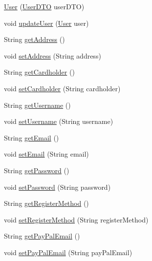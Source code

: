 \begin{DoxyCompactItemize}
\item 
\mbox{\hyperlink{class_s_p_q_1_1data_1_1_user_af8e381901a649027950a0b0f8b22a235}{User}} (\mbox{\hyperlink{class_s_p_q_1_1dto_1_1_user_d_t_o}{User\+D\+TO}} user\+D\+TO)
\item 
void \mbox{\hyperlink{class_s_p_q_1_1data_1_1_user_ac472400b9deed770cf6f3591dc9e2886}{update\+User}} (\mbox{\hyperlink{class_s_p_q_1_1data_1_1_user}{User}} user)
\item 
String \mbox{\hyperlink{class_s_p_q_1_1data_1_1_user_a47d0065ad917d39d23acd62835575179}{get\+Address}} ()
\item 
void \mbox{\hyperlink{class_s_p_q_1_1data_1_1_user_ab6e40ae379cda1d98a5873365df30736}{set\+Address}} (String address)
\item 
String \mbox{\hyperlink{class_s_p_q_1_1data_1_1_user_a6184a8aa1ccfc02796356f648ebf37ee}{get\+Cardholder}} ()
\item 
void \mbox{\hyperlink{class_s_p_q_1_1data_1_1_user_a0fe49415c82bbbbfa0b22822f054157f}{set\+Cardholder}} (String cardholder)
\item 
String \mbox{\hyperlink{class_s_p_q_1_1data_1_1_user_a55d2e322edbbe446287ce25baecdd421}{get\+Username}} ()
\item 
void \mbox{\hyperlink{class_s_p_q_1_1data_1_1_user_ab173655f6fbe57a59cd0da8d0cfbed06}{set\+Username}} (String username)
\item 
String \mbox{\hyperlink{class_s_p_q_1_1data_1_1_user_a4f3ae0062ee7529314a5b791707ff4b4}{get\+Email}} ()
\item 
void \mbox{\hyperlink{class_s_p_q_1_1data_1_1_user_ab7132f971882fb88afc6999cf5473ef4}{set\+Email}} (String email)
\item 
String \mbox{\hyperlink{class_s_p_q_1_1data_1_1_user_a688c1eadd21594d52967d87289e23ce2}{get\+Password}} ()
\item 
void \mbox{\hyperlink{class_s_p_q_1_1data_1_1_user_aa5bcf362d3c9c4746f406239bcb041f5}{set\+Password}} (String password)
\item 
String \mbox{\hyperlink{class_s_p_q_1_1data_1_1_user_a4a336e889bfdefbd439134b27e8873fc}{get\+Register\+Method}} ()
\item 
void \mbox{\hyperlink{class_s_p_q_1_1data_1_1_user_a6519805f5204c8d1add91a917634f588}{set\+Register\+Method}} (String register\+Method)
\item 
String \mbox{\hyperlink{class_s_p_q_1_1data_1_1_user_ad3a5ab9fa36272afbc99e7ebfc7de108}{get\+Pay\+Pal\+Email}} ()
\item 
void \mbox{\hyperlink{class_s_p_q_1_1data_1_1_user_abe8156eec92d2d94d290b96af8e8ea94}{set\+Pay\+Pal\+Email}} (String pay\+Pal\+Email)

\end{DoxyCompactItemize}
